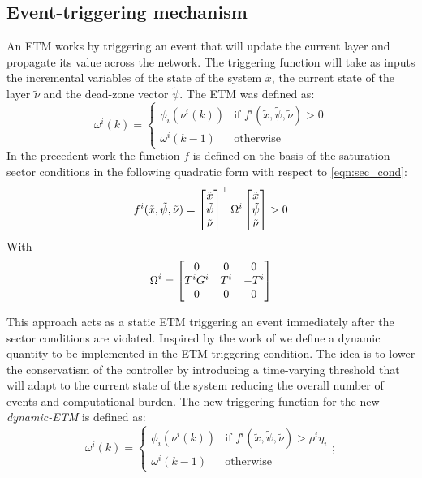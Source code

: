 \documentclass{article}
\begin{document}
\subsection{Event-triggering mechanism}
An ETM works by triggering an event that will update the current layer and propagate its value across the network. The triggering function will take as inputs the incremental variables of the state of the system 
$\tilde{x}$, the current state of the layer $\tilde{\nu}$ and the dead-zone vector $\tilde{\psi}$. The ETM was defined as:
\begin{equation}
  \omega^{i}(k) = \begin{cases}
    \phi_i(\nu^i(k)) & \text{if } f^i(\tilde{x}, \tilde{\psi}, \tilde{\nu}) > 0\\
    \omega^{i}(k-1) & \text{otherwise}
  \end{cases}
\end{equation}
In the precedent work \cite{css-extended} the function $f$ is defined on the basis of the saturation sector conditions in the following quadratic form with respect to \ref{eqn:sec_cond}:
\begin{equation}\label{eqn:base_omega}
  f^i(\tilde{x}, \tilde{\psi}, \tilde{\nu}) =
  \left[\begin{matrix}\tilde{x}\\ \tilde{\psi} \\ \tilde{\nu}\end{matrix}\right]^\top
  \Omega^i
  \left[\begin{matrix}\tilde{x}\\ \tilde{\psi} \\ \tilde{\nu}\end{matrix}\right] > 0
\end{equation}
With $$
\Omega^i =  \left[\begin{matrix}
    0 & 0 & 0\\
    T^i G^i & T^i & -T^i\\
    0 & 0 & 0
  \end{matrix}\right] 
$$

This approach acts as a static ETM triggering an event immediately after the sector conditions are violated. Inspired by the work of \cite{data-driven} we define a dynamic quantity to be implemented in the ETM triggering condition. The idea is to lower the conservatism of the controller by introducing a time-varying threshold that will adapt to the current state of the system reducing the overall number of events and computational burden. The new triggering function for the new \emph{dynamic-ETM} is defined as:
\begin{equation}\label{eqn:dynamic_trig}
  \omega^{i}(k) = \begin{cases}
    \phi_i(\nu^i(k)) & \text{if } f^i(\tilde{x}, \tilde{\psi}, \tilde{\nu}) > \rho^i \eta_i\\
    \omega^{i}(k-1) & \text{otherwise}
  \end{cases};
\end{equation}
\end{document}

